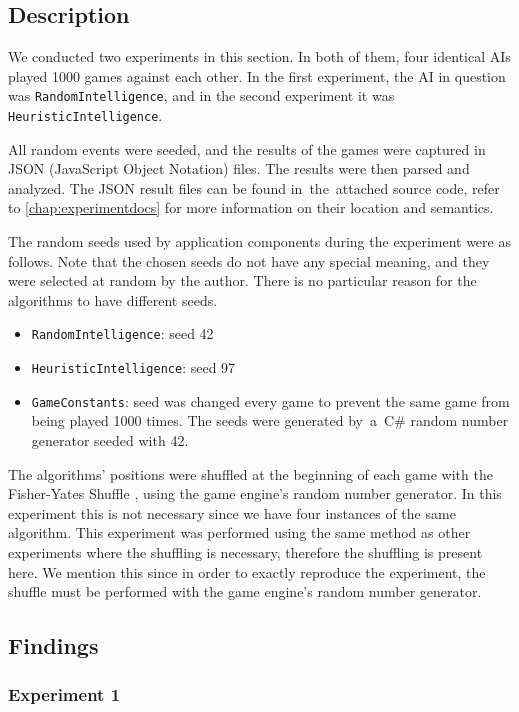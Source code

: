 \subsection{Description}

We conducted two experiments in this section. In both of them, four identical AIs
played 1000 games against each other. In the first experiment, the AI in question was
\texttt{RandomIntelligence}, and in the second
experiment it was \texttt{HeuristicIntelligence}.

All random events were seeded, and the results of the games were captured in JSON
(JavaScript Object Notation) files.
The results were then parsed and analyzed. The JSON result files can be found
in~the~attached source code, refer to \autoref{chap:experimentdocs} for more information
on their location and semantics.

The random seeds used by application components during the experiment were as follows.
Note that the chosen seeds do not have any special meaning, and they were selected
at random by the author. There is no particular reason for the algorithms to have
different seeds.
\begin{itemize}
    \item \texttt{RandomIntelligence}: seed 42
    \item \texttt{HeuristicIntelligence}: seed 97
    \item \texttt{GameConstants}: seed was changed every game to prevent the same game from
        being played 1000 times. The seeds were generated by~a~C\# 
        random number generator seeded with 42.
\end{itemize}

The algorithms' positions were shuffled at the beginning of each game with
the Fisher-Yates Shuffle \cite{Knuth98}, using the game engine's random
number generator. In this experiment this is not necessary since we have
four instances of the same algorithm. This experiment was performed
using the same method as other experiments where the shuffling is necessary,
therefore the shuffling is present here. We mention this since in order to
exactly reproduce the experiment, the shuffle must be performed with the game engine's
random number generator.

\subsection{Findings}

\subsubsection{Experiment 1}

